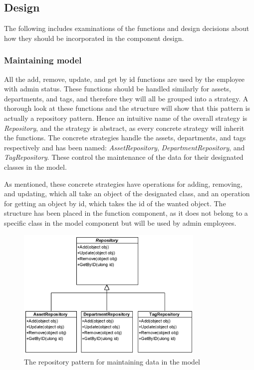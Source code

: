 \subsection{Design}
The following includes examinations of the functions and design decisions about how they should be incorporated in the component design.

\subsubsection{Maintaining model}
All the add, remove, update, and get by id functions are used by the employee with admin status. These functions should be handled similarly for assets, departments, and tags, and therefore they will all be grouped into a strategy. A thorough look at these functions and the structure will show that this pattern is actually a repository pattern. Hence an intuitive name of the overall strategy is \textit{Repository}, and the strategy is abstract, as every concrete strategy will inherit the functions. The concrete strategies handle the assets, departments, and tags respectively and has been named: \textit{AssetRepository}, \textit{DepartmentRepository}, and \textit{TagRepository}. These control the maintenance of the data for their designated classes in the model.
\par
As mentioned, these concrete strategies have operations for adding, removing, and updating, which all take an object of the designated class, and an operation for getting an object by id, which takes the id of the wanted object. The structure has been placed in the function component, as it does not belong to a specific class in the model component but will be used by admin employees.
\begin{figure}[H]
    \centering
    \includegraphics[width=0.8\textwidth]{figures/FunctionComponent/Repository_pattern.png}
    \caption{The repository pattern for maintaining data in the model}
    \label{fig:RepositoryPattern}
\end{figure}

